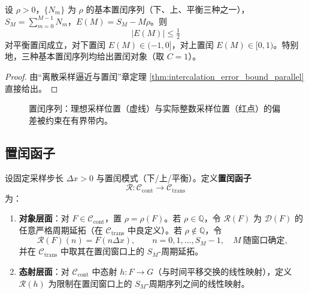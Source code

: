 \begin{lemma}[置闰误差有界性]\label{lem:intercalation_error_bound_category}
设 $\rho>0$，$\{N_m\}$ 为 $\rho$ 的基本置闰序列（下、上、平衡三种之一），$S_M=\sum_{m=0}^{M-1}N_m$，$E(M)=S_M-M\rho$。则
\[
|E(M)|\le \tfrac{1}{2}
\]
对平衡置闰成立，对下置闰 $E(M)\in(-1,0]$，对上置闰 $E(M)\in[0,1)$。特别地，三种基本置闰序列均给出置闰对象（取 $C=1$）。
\end{lemma}

\begin{proof}
由“离散采样逼近与置闰”章定理 \ref{thm:intercalation_error_bound_parallel} 直接给出。
\end{proof}

\begin{figure}[htbp]
\centering
{}
\caption{置闰序列：理想采样位置（虚线）与实际整数采样位置（红点）的偏差被约束在有界带内。}
\label{fig:intercalation_error}
\end{figure}

\subsection{置闰函子}

\begin{definition}[置闰函子]\label{def:intercalation_functor}
设固定采样步长 $\Delta x>0$ 与置闰模式（下/上/平衡）。定义\textbf{置闰函子}
\[
\mathcal{R}:\mathcal{C}_{\text{cont}}\to\mathcal{C}_{\text{trans}}
\]
为：
\begin{enumerate}[label=(\roman*)]
    \item \textbf{对象层面}：对 $F\in\mathcal{C}_{\text{cont}}$，置 $\rho=\rho(F)$。若 $\rho\in\mathbb{Q}$，令 $\mathcal{R}(F)$ 为 $\mathcal{D}(F)$ 的任意严格周期延拓（在 $\mathcal{C}_{\text{trans}}$ 中良定义）。若 $\rho\notin\mathbb{Q}$，令
    \[
    \mathcal{R}(F)(n)=F(n\Delta x),\qquad n=0,1,\dots,S_M-1,\quad M\ \text{随窗口确定},
    \]
    并在 $\mathcal{C}_{\text{trans}}$ 中取其在置闰窗口上的 $S_M$-周期延拓。
    \item \textbf{态射层面}：对 $\mathcal{C}_{\text{cont}}$ 中态射 $h:F\to G$（与时间平移交换的线性映射），定义 $\mathcal{R}(h)$ 为限制在置闰窗口上的 $S_M$-周期序列之间的线性映射。
\end{enumerate}
\end{definition}

